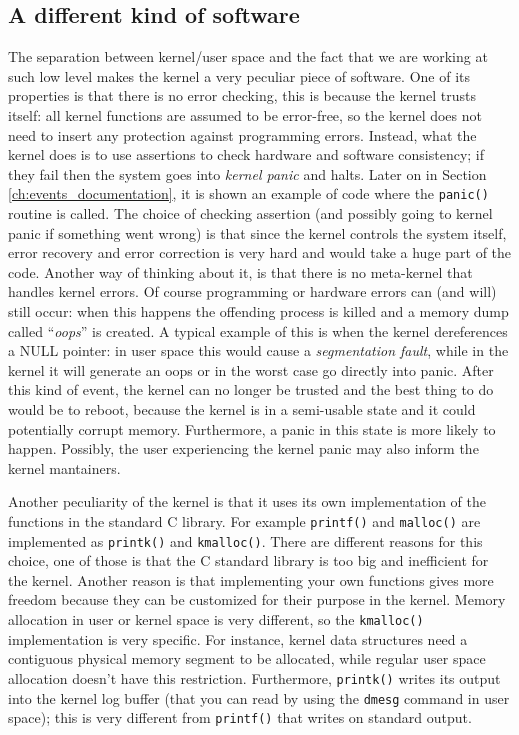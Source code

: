\subsection{A different kind of software}
The separation between kernel/user space and the fact that we are working at such low level makes the kernel a very peculiar piece of software. One of its properties is that there is no error checking, this is because the kernel trusts itself: all kernel functions are assumed to be error-free, so the kernel does not need to insert any protection against programming errors\cite{cesati}. Instead, what the kernel does is to use assertions to check hardware and software consistency; if they fail then the system goes into \textit{kernel panic} and halts. Later on in Section \ref{ch:events_documentation}, it is shown an example of code where the \verb|panic()| routine is called. The choice of checking assertion (and possibly going to kernel panic if something went wrong) is that since the kernel controls the system itself, error recovery and error correction is very hard and would take a huge part of the code. Another way of thinking about it, is that there is no meta-kernel that handles kernel errors. Of course programming or hardware errors can (and will) still occur: when this happens the offending process is killed and a memory dump called ``\textit{oops}'' is created. A typical example of this is when the kernel dereferences a NULL pointer: in user space this would cause a \textit{segmentation fault}, while in the kernel it will generate an oops or in the worst case go directly into panic. After this kind of event, the kernel can no longer be trusted and the best thing to do would be to reboot, because the kernel is in a semi-usable state and it could potentially corrupt memory. Furthermore, a panic in this state is more likely to happen. %
Possibly, the user experiencing the kernel panic may also inform the kernel mantainers.

Another peculiarity of the kernel is that it uses its own implementation of the functions in the standard C library. For example \verb|printf()| and \verb|malloc()| are implemented as \verb|printk()| and \verb|kmalloc()|. There are different reasons for this choice, one of those is that the C standard library is too big and inefficient for the kernel. Another reason is that implementing your own functions gives more freedom because they can be customized for their purpose in the kernel. Memory allocation in user or kernel space is very different, so the \verb|kmalloc()| implementation is very specific. For instance, kernel data structures need a contiguous physical memory segment to be allocated, while regular user space allocation doesn't have this restriction. Furthermore, \verb|printk()| writes its output into the kernel log buffer (that you can read by using the \verb|dmesg| command in user space); this is very different from \verb|printf()| that writes on standard output.

